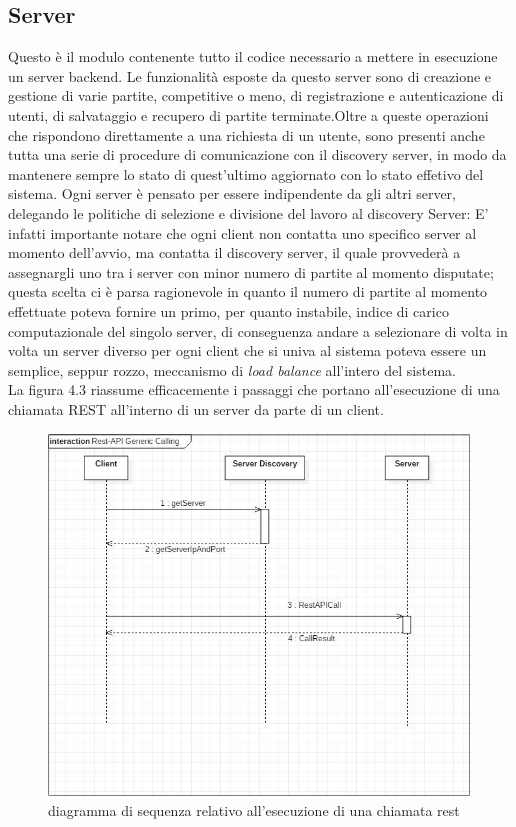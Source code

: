  \subsection {Server}\label{subsec:details:server}
 Questo è il modulo contenente tutto il codice necessario a mettere in esecuzione un server backend. Le funzionalità esposte da questo server sono di creazione e gestione di varie partite, competitive o meno, di registrazione e autenticazione di utenti, di salvataggio e recupero di partite terminate.Oltre a queste operazioni che rispondono direttamente a una richiesta di un utente, sono presenti anche tutta una serie di procedure di comunicazione con il discovery server, in modo da mantenere sempre lo stato di quest'ultimo aggiornato con lo stato effetivo del sistema.
 Ogni server è pensato per essere indipendente da gli altri server, delegando le politiche di selezione e divisione del lavoro al discovery Server:
 E' infatti importante notare che ogni client non contatta uno specifico server al momento dell'avvio, ma contatta il discovery server, il quale provvederà a assegnargli uno tra i server con minor numero di partite al momento disputate; questa scelta ci è parsa ragionevole in quanto il numero di partite al momento effettuate poteva fornire un primo, per quanto instabile, indice di carico computazionale del singolo server, di conseguenza andare a selezionare di volta in volta un server diverso per ogni client che si univa al sistema poteva essere un semplice, seppur rozzo, meccanismo di \textit{load balance} all'intero del sistema.\\
 La figura 4.3 riassume efficacemente i passaggi che portano all'esecuzione di una chiamata REST all'interno di un server da parte di un client.\\

 \begin{figure}[htbp]
   \includegraphics[width=\textwidth,height=\textheight,keepaspectratio]{restApiCall}
    \caption{diagramma di sequenza relativo all'esecuzione di una chiamata rest}
 \end{figure}

